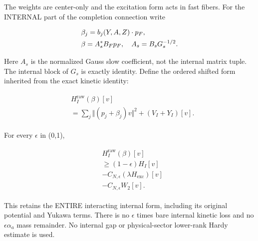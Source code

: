 The weights are center-only and the excitation form acts in fast fibers.
For the INTERNAL part of the completion connection write

\begin{gather*}
\begin{aligned}
& \beta _{j} = b_{j}(Y,A,Z) \cdot  p_{F}, \\
& \beta  = A_{s}^{*} B_{F} p_{F}, \quad  A_{s} = B_{s} G_{s}^{-1/2}.
\end{aligned}\notag
\end{gather*}

Here \(A_{s}\) is the normalized Gauss slow coefficient, not the
internal matrix tuple. The internal block of \(G_{s}\) is exactly
identity. Define the ordered shifted form inherited from the exact
kinetic identity:

\begin{gather*}
\begin{aligned}
& H_{I}^{\mathrm{raw}}(\beta )[v] \\
& = \sum _{j} \Vert (p_{j}+\beta _{j})v\Vert ^{2}+(V_{I}+Y_{I})[v].
\end{aligned}\tag{1.2}
\end{gather*}

For every \(\epsilon\) in (0,1),

\begin{gather*}
\begin{aligned}
& H_{I}^{\mathrm{raw}}(\beta )[v] \\
& \ge  (1-\epsilon )H_{I}[v] \\
& -C_{N,\epsilon}(\lambda  H_{\mathrm{exc}})[v] \\
& -C_{N,\epsilon}W_{2}[v].
\end{aligned}\tag{1.3}
\end{gather*}

This retains the ENTIRE interacting internal form, including its
original potential and Yukawa terms. There is no \(\epsilon\) times bare
internal kinetic loss and no \(\epsilon  \alpha _{a}\) mass remainder.
No internal gap or physical-sector lower-rank Hardy estimate is used.

